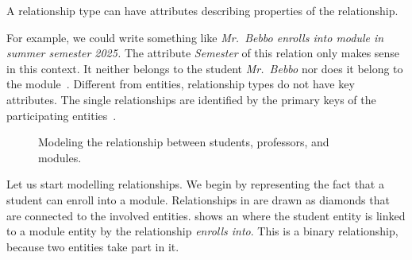 %
\begin{definition}%
\label{def:relationshipAttribute}%
A relationship type can have attributes describing properties of the relationship.%
\end{definition}%
%
For example, we could write something like \emph{Mr.~Bebbo enrolls into module  in summer semester 2025.}
The attribute \emph{Semester} of this relation only makes sense in this context.
It neither belongs to the student \emph{Mr.~Bebbo} nor does it belong to the module~.
Different from entities, relationship types do not have key attributes.
The single relationships are identified by the primary keys of the participating entities~\cite{G2011EW2ITDS:CMUTERM}.

\begin{figure}%
\centering%
%
%
%
\floatRowSep%
%
%
%
\floatRowSep%
%
%
%
\floatRowSep%
%
\xdef\erdStudentModuleProfIII{\currentDir/erdStudentModuleProf3}%
%
%
\caption{Modeling the relationship between students, professors, and modules.}%
\label{fig:erdStudentModuleProf}%
%
\end{figure}%
%
Let us start modelling relationships.
We begin by representing the fact that a student can enroll into a module.
Relationships in  are drawn as diamonds that are connected to the involved entities.
 shows an  where the student entity is linked to a module entity by the relationship \emph{enrolls into}.
This is a binary relationship, because two entities take part in it.


